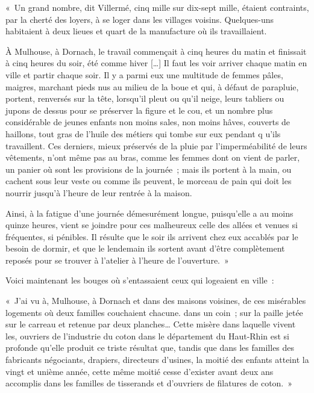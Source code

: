 \documentclass[french,twoside]{book} %
\newenvironment{quoteblock}%
  {\begin{quoting}}
  {\end{quoting}}
\newenvironment{quotebar}{%
    \def\FrameCommand{{\color{rubric!10!}\vrule width 0.5em} \hspace{0.9em}}%
    \def\OuterFrameSep{\itemsep} %
    \MakeFramed {\advance\hsize-\width \FrameRestore}
  }%
  {%
    \endMakeFramed
  }
\renewenvironment{quoteblock}%
  {%
    \savenotes
    \setstretch{0.9}
    \normalfont
    \begin{quotebar}
  }
  {%
    \end{quotebar}
    \spewnotes
  }
\begin{document}
\begin{quoteblock}
 \noindent « Un grand nombre, dit Villermé, cinq mille sur dix-sept mille, étaient contraints, par la cherté des loyers, à se loger dans les villages voisins. Quelques-uns habitaient à deux lieues et quart de la manufacture où ils travaillaient.\par
 À Mulhouse, à Dornach, le travail commençait à cinq heures du matin et finissait à cinq heures du soir, été comme hiver […] Il faut les voir arriver chaque matin en ville et partir chaque soir. Il y a parmi eux une multitude de femmes pâles, maigres, marchant pieds nus au milieu de la boue et qui, à défaut de parapluie, portent, renversés sur la tête, lorsqu’il pleut ou qu’il neige, leurs tabliers ou jupons de dessus pour se préserver la figure et le cou, et un nombre plus considérable de jeunes enfants non moins sales, non moins hâves, couverts de haillons, tout gras de l’huile des métiers qui tombe sur eux pendant q u'ils travaillent. Ces derniers, mieux préservés de la pluie par l’imperméabilité de leurs vêtements, n’ont même pas au bras, comme les femmes dont on vient de parler, un panier où sont les provisions de la journée ; mais ils portent à la main, ou cachent sous leur veste ou comme ils peuvent, le morceau de pain qui doit les nourrir jusqu’à l’heure de leur rentrée à la maison.\par
 Ainsi, à la fatigue d’une journée démesurément longue, puisqu’elle a au moins quinze heures, vient se joindre pour ces malheureux celle des allées et venues si fréquentes, si pénibles. Il résulte que le soir ils arrivent chez eux accablés par le besoin de dormir, et que le lendemain ils sortent avant d’être complètement reposés pour se trouver à l’atelier à l’heure de l’ouverture. »
\end{quoteblock}

\noindent Voici maintenant les bouges où s’entassaient ceux qui logeaient en ville :\par

\begin{quoteblock}
 \noindent « J’ai vu à, Mulhouse, à Dornach et dans des maisons voisines, de ces misérables logements où deux familles couchaient chacune. dans un coin ; sur la paille jetée sur le carreau et retenue par deux planches… Cette misère dans laquelle vivent les, ouvriers de l’industrie du coton dans le département du Haut-Rhin est si profonde qu’elle produit ce triste résultat que, tandis que dans les familles des fabricants négociants, drapiers, directeurs d’usines, la moitié des enfants atteint la vingt et unième année, cette même moitié cesse d’exister avant deux ans accomplis dans les familles de tisserands et d’ouvriers de filatures de coton. »
\end{quoteblock}
\end{document}
